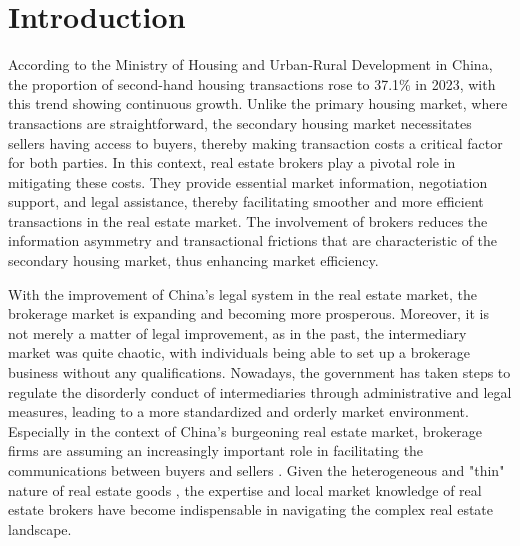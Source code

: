 \documentclass[11pt]{article}
\begin{document}
\thispagestyle{empty}

\clearpage
\egroup
\setcounter{page}{1}



\section{Introduction \label{sec:introduction}}

\noindent



According to the Ministry of Housing and Urban-Rural Development in China, the proportion of second-hand housing transactions rose to 37.1\% in 2023, with this trend showing continuous growth. Unlike the primary housing market, where transactions are straightforward, the secondary housing market necessitates sellers having access to buyers, thereby making transaction costs a critical factor for both parties. In this context, real estate brokers play a pivotal role in mitigating these costs. They provide essential market information, negotiation support, and legal assistance, thereby facilitating smoother and more efficient transactions in the real estate market. The involvement of brokers reduces the information asymmetry and transactional frictions that are characteristic of the secondary housing market, thus enhancing market efficiency. 

With the improvement of China's legal system in the real estate market, the brokerage market is expanding and becoming more prosperous. Moreover, it is not merely a matter of legal improvement, as in the past, the intermediary market was quite chaotic, with individuals being able to set up a brokerage business without any qualifications. Nowadays, the government has taken steps to regulate the disorderly conduct of intermediaries through administrative and legal measures, leading to a more standardized and orderly market environment. Especially in the context of China's burgeoning real estate market, brokerage firms are assuming an increasingly important role in facilitating the communications between buyers and sellers \citep{glaeser_real_2017}. Given the heterogeneous and "thin" nature of real estate goods \citep{HAN2015813}, the expertise and local market knowledge of real estate brokers have become indispensable in navigating the complex real estate landscape.
\end{document}
